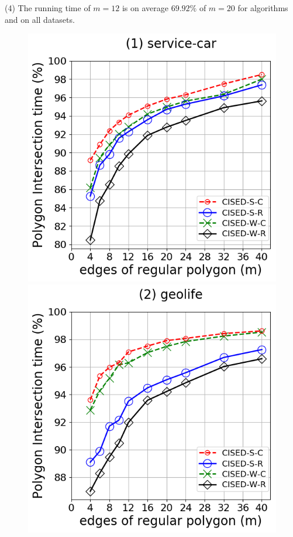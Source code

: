\ni(4) The running time of $m=12$ is on average $69.92\%$ of $m=20$ for algorithms \cist and \cista on all datasets.





\begin{figure}[tb!]
	\centering
	\includegraphics[scale = 0.3]{Figures/Exp-M-poly-time-ratio-service.png}
	\includegraphics[scale = 0.3]{Figures/Exp-M-poly-time-ratio-geolife.png}

\end{figure}

